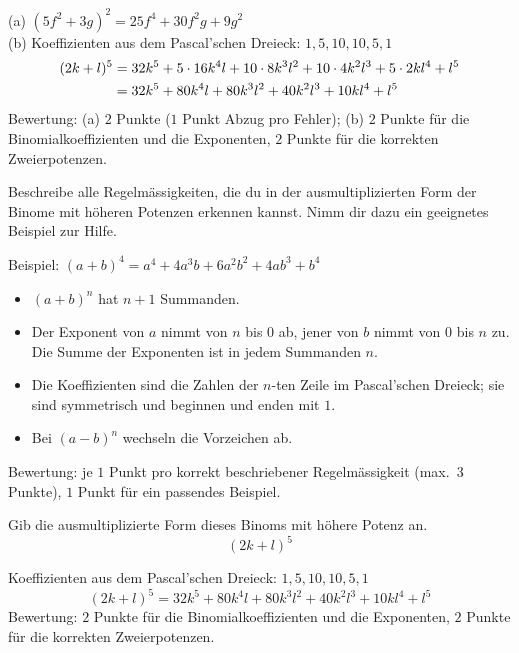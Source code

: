 \documentclass[11pt]{exam}
\begin{document}
\begin{questions}
{\begin{solution}
	(a) $(5f^2+3g)^2=25f^4+30f^2g+9g^2$\\
	(b) Koeffizienten aus dem Pascal'schen Dreieck: $1,5,10,10,5,1$
	\begin{align*}
		(2k+l)^5&=32k^5+5\cdot16k^4l+10\cdot8k^3l^2+10\cdot4k^2l^3+5\cdot2kl^4+l^5\\
		&=32k^5+80k^4l+80k^3l^2+40k^2l^3+10kl^4+l^5
	\end{align*}
	Bewertung: (a) $2$ Punkte ($1$ Punkt Abzug pro Fehler); (b) $2$ Punkte für die Binomialkoeffizienten und die Exponenten, $2$ Punkte für die korrekten Zweierpotenzen.
\end{solution}}
{}

\question[4]
Beschreibe alle Regelmässigkeiten, die du in der ausmultiplizierten Form der Binome mit höheren Potenzen erkennen kannst. Nimm dir dazu ein geeignetes Beispiel zur Hilfe.
{\begin{solution}
	Beispiel: $(a+b)^4=a^4+4a^3b+6a^2b^2+4ab^3+b^4$
	\begin{itemize}
		\item $(a+b)^n$ hat $n+1$ Summanden.
		\item Der Exponent von $a$ nimmt von $n$ bis $0$ ab, jener von $b$ nimmt von $0$ bis $n$ zu. Die Summe der Exponenten ist in jedem Summanden $n$.
		\item Die Koeffizienten sind die Zahlen der $n$-ten Zeile im Pascal'schen Dreieck; sie sind symmetrisch und beginnen und enden mit $1$.
		\item Bei $(a-b)^n$ wechseln die Vorzeichen ab.
	\end{itemize}
	Bewertung: je $1$ Punkt pro korrekt beschriebener Regelmässigkeit (max.\ $3$ Punkte), $1$ Punkt für ein passendes Beispiel.
\end{solution}}
{}

\question[4]
Gib die ausmultiplizierte Form dieses Binoms mit höhere Potenz an. \[(2k+l)^5\]
{\begin{solution}
	Koeffizienten aus dem Pascal'schen Dreieck: $1,5,10,10,5,1$
	\[(2k+l)^5=32k^5+80k^4l+80k^3l^2+40k^2l^3+10kl^4+l^5\]
	Bewertung: $2$ Punkte für die Binomialkoeffizienten und die Exponenten, $2$ Punkte für die korrekten Zweierpotenzen.
\end{solution}}
{}


\end{questions}
\end{document}
